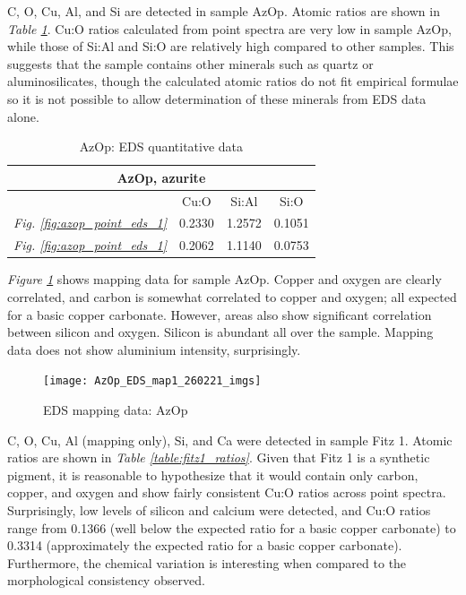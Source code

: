 
C, O, Cu, Al, and Si are detected in sample AzOp. Atomic ratios are shown in \textit{Table \ref{table:azop_ratios}}. Cu:O ratios calculated from point spectra are very low in sample AzOp, while those of Si:Al and Si:O are relatively high compared to other samples. This suggests that the sample contains other minerals such as quartz or aluminosilicates, though the calculated atomic ratios do not fit empirical formulae so it is not possible to allow determination of these minerals from EDS data alone.

\begin{table}[H]
\caption{AzOp: EDS quantitative data}
\centering
\label{table:azop_ratios}
\begin{tabular}{c c c c}
\toprule
\multicolumn{4}{c}{AzOp, azurite} \\
\midrule
~ & Cu:O & Si:Al & Si:O \\
\midrule
\textit{Fig. \ref{fig:azop_point_eds_1}} & 0.2330 & 1.2572 & 0.1051 \\
\textit{Fig. \ref{fig:azop_point_eds_1}} & 0.2062 & 1.1140 & 0.0753 \\
\bottomrule
\end{tabular}
\end{table}

\textit{Figure \ref{fig:azop_map1}} shows mapping data for sample AzOp. Copper and oxygen are clearly correlated, and carbon is somewhat correlated to copper and oxygen; all expected for a basic copper carbonate. However, areas also show significant correlation between silicon and oxygen. Silicon is abundant all over the sample. Mapping data does not show aluminium intensity, surprisingly. 

\begin{figure}[H]
\centering
  \texttt{[image: AzOp\_EDS\_map1\_260221\_imgs]}
\caption[EDS mapping data: AzOp]{EDS mapping data: AzOp}
\label{fig:azop_map1}
\end{figure}


C, O, Cu, Al (mapping only), Si, and Ca were detected in sample Fitz 1. Atomic ratios are shown in \textit{Table \ref{table:fitz1_ratios}}. Given that Fitz 1 is a synthetic pigment, it is reasonable to hypothesize that it would contain only carbon, copper, and oxygen and show fairly consistent Cu:O ratios across point spectra. Surprisingly, low levels of silicon and calcium were detected, and Cu:O ratios range from 0.1366 (well below the expected ratio for a basic copper carbonate) to 0.3314 (approximately the expected ratio for a basic copper carbonate). Furthermore, the chemical variation is interesting when compared to the morphological consistency observed.

